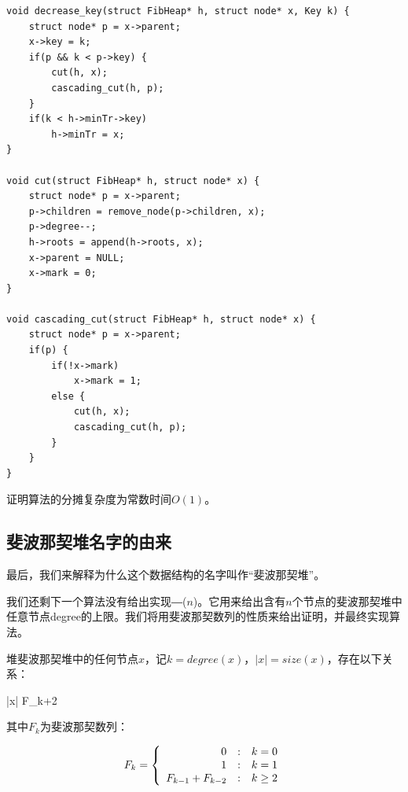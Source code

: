 \documentclass[b5paper]{ctexart}
\begin{document}
\lstset{language=C}
\begin{lstlisting}
void decrease_key(struct FibHeap* h, struct node* x, Key k) {
    struct node* p = x->parent;
    x->key = k;
    if(p && k < p->key) {
        cut(h, x);
        cascading_cut(h, p);
    }
    if(k < h->minTr->key)
        h->minTr = x;
}

void cut(struct FibHeap* h, struct node* x) {
    struct node* p = x->parent;
    p->children = remove_node(p->children, x);
    p->degree--;
    h->roots = append(h->roots, x);
    x->parent = NULL;
    x->mark = 0;
}

void cascading_cut(struct FibHeap* h, struct node* x) {
    struct node* p = x->parent;
    if(p) {
        if(!x->mark)
            x->mark = 1;
        else {
            cut(h, x);
            cascading_cut(h, p);
        }
    }
}
\end{lstlisting}

\begin{Exercise}
证明算法的分摊复杂度为常数时间$O(1)$。
\end{Exercise}

\subsection{斐波那契堆名字的由来}

最后，我们来解释为什么这个数据结构的名字叫作“斐波那契堆”。

我们还剩下一个算法没有给出实现―($n$)。它用来给出含有$n$个节点的斐波那契堆中任意节点degree的上限。我们将用斐波那契数列的性质来给出证明，并最终实现算法。

\begin{lemma}
\label{lemma:Fib-degree}
堆斐波那契堆中的任何节点$x$，记$k = degree(x)$，$|x| = size(x)$，存在以下关系：

\be
  |x| \geq F_{k+2}
\ee

其中$F_k$为斐波那契数列：

\[
F_k = \left \{
  \begin{array}
  {r@{\quad:\quad}l}
  0 & k = 0 \\
  1 & k = 1 \\
  F_{k-1} + F_{k-2} & k \geq 2
  \end{array}
\right.
\]
\end{lemma}
\end{document}
